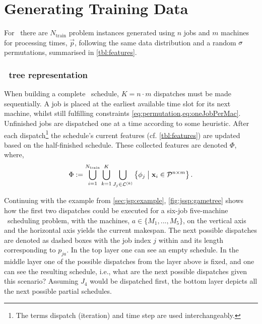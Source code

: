 
\chapter{Generating Training Data}\label{ch:gentrdat} 

For \jsp\ there are $N_{\text{train}}$ problem instances generated using $n$ 
jobs and $m$ machines for processing times, $\vec{p}$, following the same data 
distribution and a random ${\mathbf{\sigma}}$ permutations, summarised in 
\cref{tbl:features}.  

\subsection{\Jsp\ tree representation}\label{sec:gen:gametree}
When building a complete \jsp\ schedule, $K=n\cdot m$ dispatches must be 
made sequentially.
A job is placed at the earliest available time slot for its next machine, 
whilst still fulfilling constraints \cref{eq:permutation,eq:oneJobPerMac}.
Unfinished jobs are dispatched one at a time according to some heuristic. 
After each dispatch\footnote{The terms dispatch (iteration) and time step are 
used interchangeably.} the schedule's current features (cf. 
\cref{tbl:features}) are updated based on the half-finished schedule. 
These collected features are denoted $\Phi$, where, 
\begin{eqnarray}\label{eq:Phi}
\Phi:= \bigcup_{i=1}^{N_{\text{train}}} 
\bigcup_{k=1}^K\bigcup_{J_j\in\mathcal{L}^{(k)}} 
\condset{\vphi_j}{\vec{x}_i\in\mathcal{P}^{n\times m} }.
\end{eqnarray}

Continuing with the example from \cref{sec:jsp:example}, 
\cref{fig:jssp:gametree} shows how the first two dispatches could be executed 
for a six-job five-machine \jsp\ scheduling problem, with the machines, 
$a\in\{M_1,...,M_5\}$, on the vertical axis and the horizontal axis yields the 
current makespan. The next possible dispatches are denoted as dashed boxes with 
the job index $j$ within and its length corresponding to $p_{ja}$.
In the top layer one can see an empty schedule.
In the middle layer one of the possible dispatches from the layer above is 
fixed, and one can see the resulting schedule, i.e., what are the next possible 
dispatches given this scenario? Assuming $J_4$ would be dispatched first, the 
bottom layer depicts all the next possible partial schedules.

